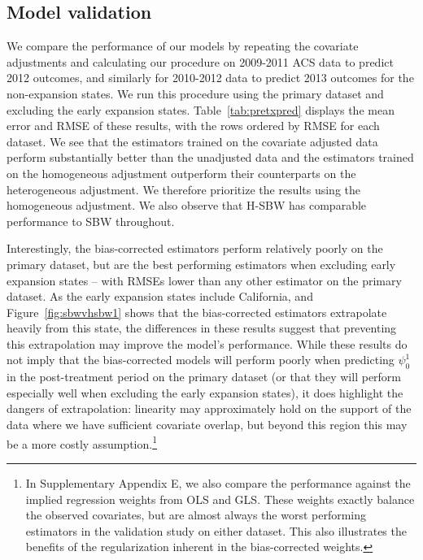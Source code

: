 \documentclass[aoas]{imsart}
\theoremstyle{plain}
\theoremstyle{remark}
\begin{document}
\subsection{Model validation}\label{sec:validation}

We compare the performance of our models by repeating the covariate adjustments and calculating our procedure on 2009-2011 ACS data to predict 2012 outcomes, and similarly for 2010-2012 data to predict 2013 outcomes for the non-expansion states. We run this procedure using the primary dataset and excluding the early expansion states. Table~\ref{tab:pretxpred} displays the mean error and RMSE of these results, with the rows ordered by RMSE for each dataset. We see that the estimators trained on the covariate adjusted data perform substantially better than the unadjusted data and the estimators trained on the homogeneous adjustment outperform their counterparts on the heterogeneous adjustment. We therefore prioritize the results using the homogeneous adjustment. We also observe that H-SBW has comparable performance to SBW throughout.

Interestingly, the bias-corrected estimators perform relatively poorly on the primary dataset, but are the best performing estimators when excluding early expansion states -- with RMSEs lower than any other estimator on the primary dataset. As the early expansion states include California, and Figure~\ref{fig:sbwvhsbw1} shows that the bias-corrected estimators extrapolate heavily from this state, the differences in these results suggest that preventing this extrapolation may improve the model's performance. While these results do not imply that the bias-corrected models will perform poorly when predicting $\psi^1_0$ in the post-treatment period on the primary dataset (or that they will perform especially well when excluding the early expansion states), it does highlight the dangers of extrapolation: linearity may approximately hold on the support of the data where we have sufficient covariate overlap, but beyond this region this may be a more costly assumption.\footnote{In Supplementary Appendix E, we also compare the performance against the implied regression weights from OLS and GLS. These weights exactly balance the observed covariates, but are almost always the worst performing estimators in the validation study on either dataset. This also illustrates the benefits of the regularization inherent in the bias-corrected weights.}
\end{document}
